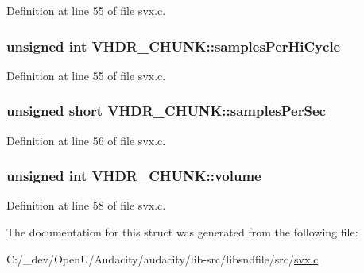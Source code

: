 Definition at line 55 of file svx.\+c.

\subsubsection[{\texorpdfstring{samples\+Per\+Hi\+Cycle}{samplesPerHiCycle}}]{\setlength{\rightskip}{0pt plus 5cm}unsigned {\bf int} V\+H\+D\+R\+\_\+\+C\+H\+U\+N\+K\+::samples\+Per\+Hi\+Cycle}\hypertarget{struct_v_h_d_r___c_h_u_n_k_a05f99b9aef9560aa59179a5baeb2782c}{}\label{struct_v_h_d_r___c_h_u_n_k_a05f99b9aef9560aa59179a5baeb2782c}


Definition at line 55 of file svx.\+c.

\subsubsection[{\texorpdfstring{samples\+Per\+Sec}{samplesPerSec}}]{\setlength{\rightskip}{0pt plus 5cm}unsigned short V\+H\+D\+R\+\_\+\+C\+H\+U\+N\+K\+::samples\+Per\+Sec}\hypertarget{struct_v_h_d_r___c_h_u_n_k_ae141fa3e2a732546d4fa04c3503b3747}{}\label{struct_v_h_d_r___c_h_u_n_k_ae141fa3e2a732546d4fa04c3503b3747}


Definition at line 56 of file svx.\+c.

\subsubsection[{\texorpdfstring{volume}{volume}}]{\setlength{\rightskip}{0pt plus 5cm}unsigned {\bf int} V\+H\+D\+R\+\_\+\+C\+H\+U\+N\+K\+::volume}\hypertarget{struct_v_h_d_r___c_h_u_n_k_a1a7e8f95172e3f507b298355d778644f}{}\label{struct_v_h_d_r___c_h_u_n_k_a1a7e8f95172e3f507b298355d778644f}


Definition at line 58 of file svx.\+c.



The documentation for this struct was generated from the following file\+:\begin{DoxyCompactItemize}
\item 
C\+:/\+\_\+dev/\+Open\+U/\+Audacity/audacity/lib-\/src/libsndfile/src/\hyperlink{svx_8c}{svx.\+c}\end{DoxyCompactItemize}
